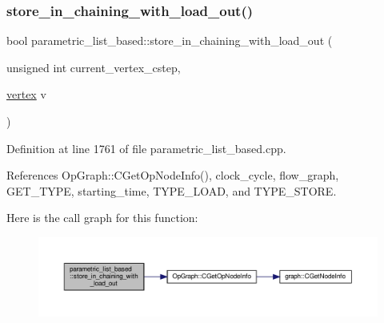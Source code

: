 \subsubsection{\texorpdfstring{store\+\_\+in\+\_\+chaining\+\_\+with\+\_\+load\+\_\+out()}{store\_in\_chaining\_with\_load\_out()}}
{\footnotesize\ttfamily bool parametric\+\_\+list\+\_\+based\+::store\+\_\+in\+\_\+chaining\+\_\+with\+\_\+load\+\_\+out (\begin{DoxyParamCaption}\item[{unsigned int}]{current\+\_\+vertex\+\_\+cstep,  }\item[{\hyperlink{graph_8hpp_abefdcf0544e601805af44eca032cca14}{vertex}}]{v }\end{DoxyParamCaption})\hspace{0.3cm}{\ttfamily [private]}}



Definition at line 1761 of file parametric\+\_\+list\+\_\+based.\+cpp.



References Op\+Graph\+::\+C\+Get\+Op\+Node\+Info(), clock\+\_\+cycle, flow\+\_\+graph, G\+E\+T\+\_\+\+T\+Y\+PE, starting\+\_\+time, T\+Y\+P\+E\+\_\+\+L\+O\+AD, and T\+Y\+P\+E\+\_\+\+S\+T\+O\+RE.

Here is the call graph for this function\+:
\nopagebreak
\begin{figure}[H]
\begin{center}
\leavevmode
\includegraphics[width=350pt]{d7/d47/classparametric__list__based_ae448d283c1cda365d88c00d67dd4e447_cgraph}
\end{center}
\end{figure}
\mbox{\label{classparametric__list__based_a86a22e0ca2f49d25402fd437d8be06a3}} 
